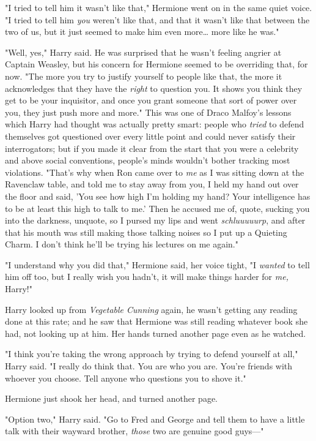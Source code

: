 "I tried to tell him it wasn't like that," Hermione went on in the same quiet 
voice. "I tried to tell him \emph{you} weren't like that, and that it wasn't 
like that between the two of us, but it just seemed to make him even 
more{\ldots} more like he was."

"Well, yes," Harry said. He was surprised that he wasn't feeling angrier at 
Captain Weasley, but his concern for Hermione seemed to be overriding that, for 
now. "The more you try to justify yourself to people like that, the more it 
acknowledges that they have the \emph{right} to question you. It shows you 
think they get to be your inquisitor, and once you grant someone that sort of 
power over you, they just push more and more." This was one of Draco Malfoy's 
lessons which Harry had thought was actually pretty smart: people who 
\emph{tried} to defend themselves got questioned over every little point and 
could never satisfy their interrogators; but if you made it clear from the 
start that you were a celebrity and above social conventions, people's minds 
wouldn't bother tracking most violations. "That's why when Ron came over to 
\emph{me} as I was sitting down at the Ravenclaw table, and told me to stay 
away from you, I held my hand out over the floor and said, 'You see how high 
I'm holding my hand? Your intelligence has to be at least this high to talk to 
me.' Then he accused me of, quote, sucking you into the darkness, unquote, so I 
pursed my lips and went \emph{schluuuuurp}, and after that his mouth was still 
making those talking noises so I put up a Quieting Charm. I don't think he'll 
be trying his lectures on me again."

"I understand why you did that," Hermione said, her voice tight, "I 
\emph{wanted} to tell him off too, but I really wish you hadn't, it will make 
things harder for \emph{me,} Harry!"

Harry looked up from \emph{Vegetable Cunning} again, he wasn't getting any 
reading done at this rate; and he saw that Hermione was still reading whatever 
book she had, not looking up at him. Her hands turned another page even as he 
watched.

"I think you're taking the wrong approach by trying to defend yourself at all," 
Harry said. "I really do think that. You are who you are. You're friends with 
whoever you choose. Tell anyone who questions you to shove it."

Hermione just shook her head, and turned another page.

"Option two," Harry said. "Go to Fred and George and tell them to have a little 
talk with their wayward brother, \emph{those} two are genuine good guys---"

